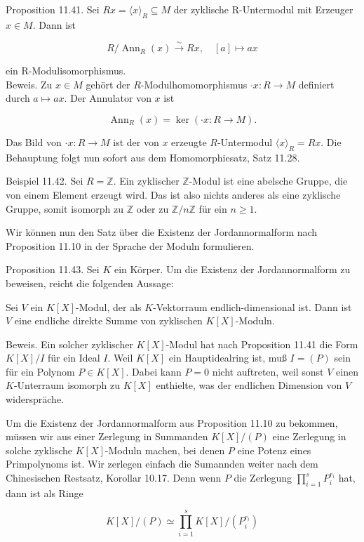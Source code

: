 \documentclass[10pt, letterpaper]{article}
\begin{document}
Proposition 11.41. Sei $R x=\langle x\rangle_{R} \subseteq M$ der zyklische R-Untermodul mit Erzeuger $x \in M$. Dann ist

$$
R / \operatorname{Ann}_{R}(x) \xrightarrow{\sim} R x, \quad[a] \mapsto a x
$$

ein R-Modulisomorphismus.\\
Beweis. Zu $x \in M$ gehört der $R$-Modulhomomorphismus $\cdot x: R \rightarrow M$ definiert durch $a \mapsto a x$. Der Annulator von $x$ ist

$$
\operatorname{Ann}_{R}(x)=\operatorname{ker}(\cdot x: R \rightarrow M) .
$$

Das Bild von $\cdot x: R \rightarrow M$ ist der von $x$ erzeugte $R$-Untermodul $\langle x\rangle_{R}=R x$. Die Behauptung folgt nun sofort aus dem Homomorphiesatz, Satz 11.28.

Beispiel 11.42. Sei $R=\mathbb{Z}$. Ein zyklischer $\mathbb{Z}$-Modul ist eine abelsche Gruppe, die von einem Element erzeugt wird. Das ist also nichts anderes als eine zyklische Gruppe, somit isomorph zu $\mathbb{Z}$ oder zu $\mathbb{Z} / n \mathbb{Z}$ für ein $n \geq 1$.

Wir können nun den Satz über die Existenz der Jordannormalform nach Proposition 11.10 in der Sprache der Moduln formulieren.

Proposition 11.43. Sei $K$ ein Körper. Um die Existenz der Jordannormalform zu beweisen, reicht die folgenden Aussage:

Sei $V$ ein $K[X]$-Modul, der als $K$-Vektorraum endlich-dimensional ist. Dann ist $V$ eine endliche direkte Summe von zyklischen $K[X]$-Moduln.

Beweis. Ein solcher zyklischer $K[X]$-Modul hat nach Proposition 11.41 die Form $K[X] / I$ für ein Ideal $I$. Weil $K[X]$ ein Hauptidealring ist, muß $I=(P)$ sein für ein Polynom $P \in K[X]$. Dabei kann $P=0$ nicht auftreten, weil sonst $V$ einen $K$-Unterraum isomorph zu $K[X]$ enthielte, was der endlichen Dimension von $V$ widerspräche.

Um die Existenz der Jordannormalform aus Proposition 11.10 zu bekommen, müssen wir aus einer Zerlegung in Summanden $K[X] /(P)$ eine Zerlegung in solche zyklische $K[X]$-Moduln machen, bei denen $P$ eine Potenz eines Primpolynoms ist. Wir zerlegen einfach die Sumannden weiter nach dem Chinesischen Restsatz, Korollar 10.17. Denn wenn $P$ die Zerlegung $\prod_{i=1}^{s} P_{i}^{r_{i}}$ hat, dann ist als Ringe

$$
K[X] /(P) \simeq \prod_{i=1}^{s} K[X] /\left(P_{i}^{r_{i}}\right)
$$
\end{document}
